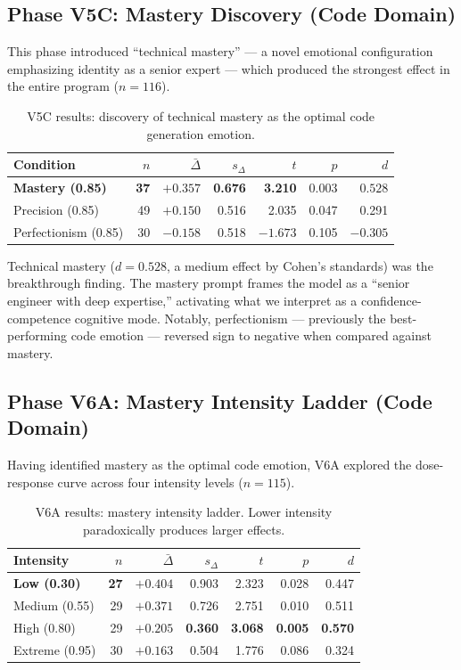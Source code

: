 \documentclass[lineno]{wlpeerj}
\begin{document}
\subsection{Phase V5C: Mastery Discovery (Code Domain)}

This phase introduced ``technical mastery'' --- a novel emotional configuration emphasizing identity as a senior expert --- which produced the strongest effect in the entire program ($n = 116$).

\begin{table}[H]
\centering
\caption{V5C results: discovery of technical mastery as the optimal code generation emotion.}
\label{tab:v5c}
\begin{tabular}{@{}lrrrrrr@{}}
\toprule
\textbf{Condition} & \textbf{$n$} & $\bar{\Delta}$ & $s_\Delta$ & $t$ & $p$ & $d$ \\
\midrule
\textbf{Mastery (0.85)} & \textbf{37} & $\mathbf{+0.357}$ & \textbf{0.676} & \textbf{3.210} & $\mathbf{0.003}$ & $\mathbf{0.528}$ \\
Precision (0.85) & 49 & $+0.150$ & 0.516 & 2.035 & 0.047 & 0.291 \\
Perfectionism (0.85) & 30 & $-0.158$ & 0.518 & $-1.673$ & 0.105 & $-0.305$ \\
\bottomrule
\end{tabular}
\end{table}

Technical mastery ($d = 0.528$, a medium effect by Cohen's standards) was the breakthrough finding. The mastery prompt frames the model as a ``senior engineer with deep expertise,'' activating what we interpret as a confidence-competence cognitive mode. Notably, perfectionism --- previously the best-performing code emotion --- reversed sign to negative when compared against mastery.

\subsection{Phase V6A: Mastery Intensity Ladder (Code Domain)}

Having identified mastery as the optimal code emotion, V6A explored the dose-response curve across four intensity levels ($n = 115$).

\begin{table}[H]
\centering
\caption{V6A results: mastery intensity ladder. Lower intensity paradoxically produces larger effects.}
\label{tab:v6a}
\begin{tabular}{@{}lrrrrrr@{}}
\toprule
\textbf{Intensity} & \textbf{$n$} & $\bar{\Delta}$ & $s_\Delta$ & $t$ & $p$ & $d$ \\
\midrule
\textbf{Low (0.30)} & \textbf{27} & $\mathbf{+0.404}$ & 0.903 & 2.323 & 0.028 & 0.447 \\
Medium (0.55) & 29 & $+0.371$ & 0.726 & 2.751 & 0.010 & 0.511 \\
High (0.80) & 29 & $+0.205$ & \textbf{0.360} & \textbf{3.068} & \textbf{0.005} & \textbf{0.570} \\
Extreme (0.95) & 30 & $+0.163$ & 0.504 & 1.776 & 0.086 & 0.324 \\
\bottomrule
\end{tabular}
\end{table}
\end{document}
